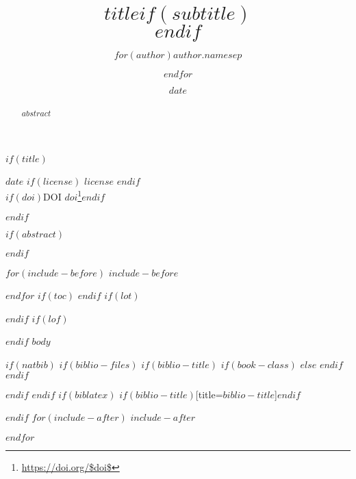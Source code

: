 \documentclass[$if(fontsize)$$fontsize$,$endif$$if(lang)$$lang$,$endif$$if(papersize)$$papersize$,$endif$$for(classoption)$$classoption$$sep$,$endfor$]{$documentclass$}
\title{$title$$if(subtitle)$\\\vspace{0.5em}{\large $subtitle$}$endif$}
\author{$for(author)$$author.name$$sep$ \and $endfor$}
\date{$date$}
\renewcommand{\href}[2]{#2\footnote{\url{#1}}}
\begin{document}
\thispagestyle{plain}

$if(title)$
\null
\vskip 6mm
{}%

$date$ $if(license)$ $license$ $endif$\\
$if(doi)$DOI \href{https://doi.org/$doi$}{$doi$}$endif$

$endif$%

$if(abstract)$
\begin{abstract}
$abstract$
\end{abstract}
$endif$

$for(include-before)$
$include-before$

$endfor$
$if(toc)$
{
\hypersetup{linkcolor=black}
\setcounter{tocdepth}{$toc-depth$}
\tableofcontents
}
$endif$
$if(lot)$
\listoftables
$endif$
$if(lof)$
\listoffigures
$endif$
$body$

$if(natbib)$
$if(biblio-files)$
$if(biblio-title)$
$if(book-class)$
\renewcommand\bibname{$biblio-title$}
$else$
\renewcommand\refname{$biblio-title$}
$endif$
$endif$


$endif$
$endif$
$if(biblatex)$
\printbibliography$if(biblio-title)$[title=$biblio-title$]$endif$

$endif$
$for(include-after)$
$include-after$

$endfor$
\end{document}
